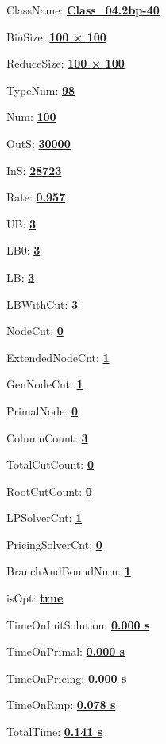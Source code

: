 \documentclass[11pt]{article}
\begin{document}
\pagestyle{empty}


ClassName: \underline{\textbf{Class_04.2bp-40}}
\par
BinSize: \underline{\textbf{100 × 100}}
\par
ReduceSize: \underline{\textbf{100 × 100}}
\par
TypeNum: \underline{\textbf{98}}
\par
Num: \underline{\textbf{100}}
\par
OutS: \underline{\textbf{30000}}
\par
InS: \underline{\textbf{28723}}
\par
Rate: \underline{\textbf{0.957}}
\par
UB: \underline{\textbf{3}}
\par
LB0: \underline{\textbf{3}}
\par
LB: \underline{\textbf{3}}
\par
LBWithCut: \underline{\textbf{3}}
\par
NodeCut: \underline{\textbf{0}}
\par
ExtendedNodeCnt: \underline{\textbf{1}}
\par
GenNodeCnt: \underline{\textbf{1}}
\par
PrimalNode: \underline{\textbf{0}}
\par
ColumnCount: \underline{\textbf{3}}
\par
TotalCutCount: \underline{\textbf{0}}
\par
RootCutCount: \underline{\textbf{0}}
\par
LPSolverCnt: \underline{\textbf{1}}
\par
PricingSolverCnt: \underline{\textbf{0}}
\par
BranchAndBoundNum: \underline{\textbf{1}}
\par
isOpt: \underline{\textbf{true}}
\par
TimeOnInitSolution: \underline{\textbf{0.000 s}}
\par
TimeOnPrimal: \underline{\textbf{0.000 s}}
\par
TimeOnPricing: \underline{\textbf{0.000 s}}
\par
TimeOnRmp: \underline{\textbf{0.078 s}}
\par
TotalTime: \underline{\textbf{0.141 s}}
\par
\newpage
\end{document}
